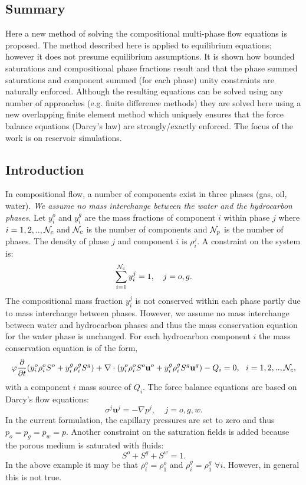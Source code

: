 \subsection{Summary}
Here a new method of solving the compositional multi-phase flow 
equations is proposed. The method described here is applied to equilibrium equations; however it does not presume equilibrium assumptions. 
It is shown how bounded saturations and compositional phase fractions 
result and that the phase summed saturations and 
component summed (for each phase) unity constraints are 
naturally enforced. Although the resulting equations can 
be solved using any number of approaches 
(e.g. finite difference methods) they are solved 
here using a new overlapping 
finite element method which uniquely ensures that the force balance 
equations (Darcy's law) are strongly/exactly enforced.  
The focus of the work is on reservoir simulations. 


\subsection{Introduction}
In compositional flow, a number of components exist in three phases (gas, oil, water).
{\it We assume no mass interchange between the water and the hydrocarbon phases}. 
Let $y_i^{o}$ and $y_i^{g}$ are the mass fractions of component $i$ 
within phase $j$ 
where $i = 1,2,..,{\cal N}_c$ and ${\cal N}_c$ is the number of components and ${\cal N}_p$ is the 
number of phases. 
The density of phase $j$ and component $i$ is $\rho_i^j$. 
A constraint on the system is: 
\begin{equation}
\sum_{i=1}^{{\cal N}_c} y_i^j = 1, ~~~ j = o,g .
\end{equation}
The compositional mass fraction $y_i^j$ is not conserved within each phase partly due to mass interchange between phases. 
However, we assume no mass interchange between water and hydrocarbon phases
and thus the mass conservation equation for the water phase is unchanged. 
For each hydrocarbon component $i$ the mass conservation
equation is of the form, 
\begin{equation}
\phi \frac{\partial}{\partial t}(y_i^o \rho_i^o S^o + y_i^g \rho_i^g S^g) + \nabla \cdot (y_i^o \rho_i^o S^o  \mathbf{u}^{o} + y_i^g \rho_i^g S^g  \mathbf{u}^{g}) - Q_i = 0, ~~i = 1,2,..,{\cal N}_c ,  
\label{saturation_2phases}
\end{equation}
with a component $i$ mass source of $Q_i$. 
The force balance equations are based on Darcy's flow equations: 
\begin{equation}
 \sigma^j {\mathbf u}^j = - \nabla p^j, ~~~~~ j = o,g,w .
\label{force-bal}
\end{equation}
In the current formulation, the capillary pressures are set to zero and thus $ p_o = p_g = p_w  = p $.
Another constraint on the saturation fields is added because the porous medium is saturated with fluids: 
\begin{equation}
 S^o + S^g + S^w = 1. 
\end{equation}
In the above example it may be that 
$\rho_i^o=\rho_1^o$ and $\rho_i^g=\rho_1^g$ $\forall i$. 
However, in general this is not true. 



